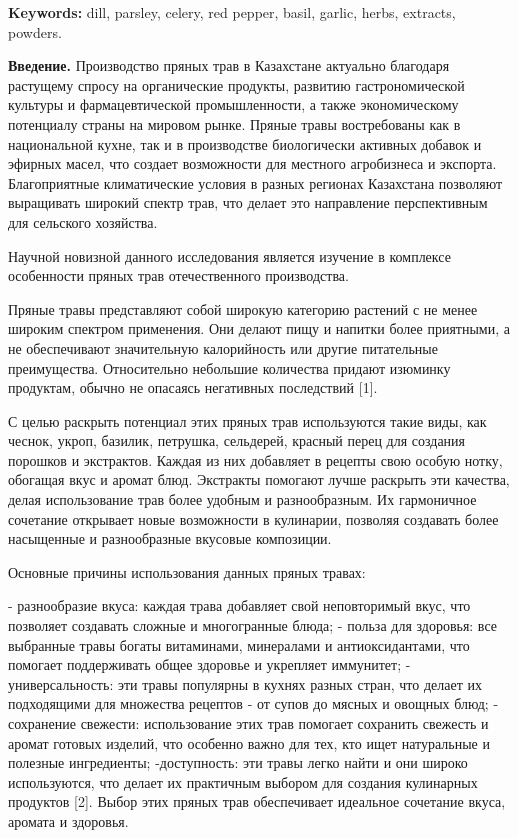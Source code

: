 {\bfseries Keywords:} dill, parsley, celery, red pepper, basil, garlic,
herbs, extracts, powders.

\begin{multicols}{2}
{\bfseries Введение.} Производство пряных трав в Казахстане актуально
благодаря растущему спросу на органические продукты, развитию
гастрономической культуры и фармацевтической промышленности, а также
экономическому потенциалу страны на мировом рынке. Пряные травы
востребованы как в национальной кухне, так и в производстве биологически
активных добавок и эфирных масел, что создает возможности для местного
агробизнеса и экспорта. Благоприятные климатические условия в разных
регионах Казахстана позволяют выращивать широкий спектр трав, что делает
это направление перспективным для сельского хозяйства.

Научной новизной данного исследования является изучение в комплексе
особенности пряных трав отечественного производства.

Пряные травы представляют собой широкую категорию растений с не менее
широким спектром применения. Они делают пищу и напитки более приятными,
а не обеспечивают значительную калорийность или другие питательные
преимущества. Относительно небольшие количества придают изюминку
продуктам, обычно не опасаясь негативных последствий {[}1{]}.

С целью раскрыть потенциал этих пряных трав используются такие виды, как
чеснок, укроп, базилик, петрушка, сельдерей, красный перец для создания
порошков и экстрактов. Каждая из них добавляет в рецепты свою особую
нотку, обогащая вкус и аромат блюд. Экстракты помогают лучше раскрыть
эти качества, делая использование трав более удобным и разнообразным. Их
гармоничное сочетание открывает новые возможности в кулинарии, позволяя
создавать более насыщенные и разнообразные вкусовые композиции.

Основные причины использования данных пряных травах:

- разнообразие вкуса: каждая трава добавляет свой неповторимый вкус, что
позволяет создавать сложные и многогранные блюда; - польза для здоровья:
все выбранные травы богаты витаминами, минералами и антиоксидантами, что
помогает поддерживать общее здоровье и укрепляет иммунитет; -
универсальность: эти травы популярны в кухнях разных стран, что делает
их подходящими для множества рецептов - от супов до мясных и овощных
блюд; - сохранение свежести: использование этих трав помогает сохранить
свежесть и аромат готовых изделий, что особенно важно для тех, кто ищет
натуральные и полезные ингредиенты; -доступность: эти травы легко найти
и они широко используются, что делает их практичным выбором для создания
кулинарных продуктов {[}2{]}. Выбор этих пряных трав обеспечивает
идеальное сочетание вкуса, аромата и здоровья.


\end{multicols}
